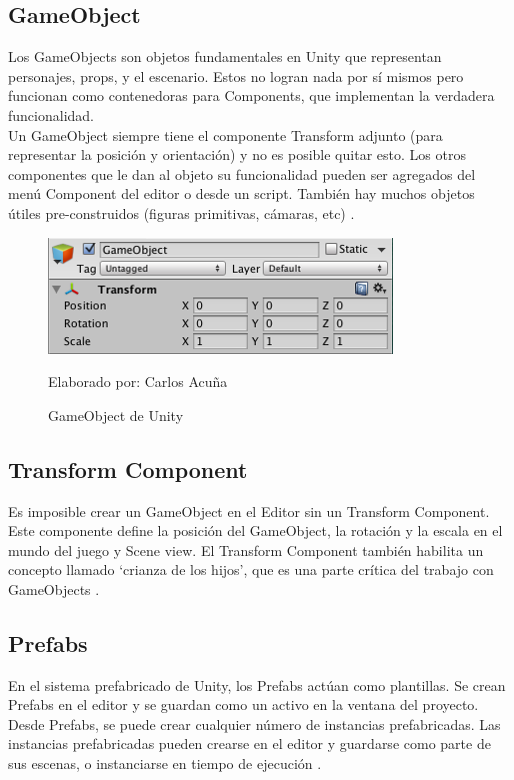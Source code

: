 \documentclass[a4paper, openright, 12pt]{report}
\begin{document}
\subsection*{GameObject}
\justify
Los GameObjects son objetos fundamentales en Unity que representan personajes, props, y el escenario. Estos no logran nada por sí mismos pero funcionan como contenedoras para Components, que implementan la verdadera funcionalidad.\\
Un GameObject siempre tiene el componente Transform adjunto (para representar la posición y orientación) y no es posible quitar esto. Los otros componentes que le dan al objeto su funcionalidad pueden ser agregados del menú Component del editor o desde un script. También hay muchos objetos útiles pre-construidos (figuras primitivas, cámaras, etc) \cite{2020unity}.

\begin{figure}[h]
\captionsetup{justification=centering,margin=2cm}
\includegraphics[scale=1]{unity07}
\centering
\caption{GameObject de Unity}
Elaborado por: Carlos Acuña
\label{fig:unity07}
\end{figure}

\subsection*{Transform Component}
\justify
Es imposible crear un GameObject en el Editor sin un Transform Component. Este componente define la posición del GameObject, la rotación y la escala en el mundo del juego y Scene view. El Transform Component también habilita un concepto llamado ‘crianza de los hijos’, que es una parte crítica del trabajo con GameObjects \cite{2020unity}. 
\clearpage
\subsection*{Prefabs}
\justify
En el sistema prefabricado de Unity, los Prefabs actúan como plantillas. Se crean Prefabs en el editor y se guardan como un activo en la ventana del proyecto. Desde Prefabs, se puede crear cualquier número de instancias prefabricadas. Las instancias prefabricadas pueden crearse en el editor y guardarse como parte de sus escenas, o instanciarse en tiempo de ejecución \cite{2020unity}.
\end{document}
